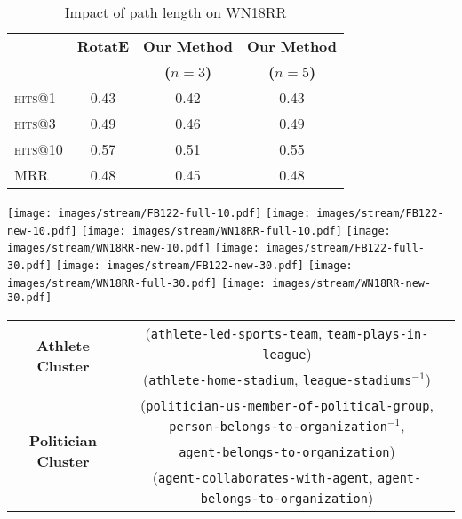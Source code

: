 \documentclass[11pt,a4paper]{article}
\newcommand{\nell}{NELL-995\xspace}
\begin{document}
\begin{table}
\centering
\small
\begin{tabular}{ l c c c}
\toprule
& \textbf{RotatE} & \textbf{Our Method} & \textbf{Our Method}   \\
& & \textbf{($n=3$)} & \textbf{($n=5$)}   \\
\midrule
  \textsc{hits}@1 & 0.43 & 0.42 & 0.43\\
  \textsc{hits}@3  & 0.49 & 0.46 & 0.49\\
  \textsc{hits}@10  & 0.57 & 0.51 & 0.55\\
  \textsc{MRR}   & 0.48 & 0.45 & 0.48\\
\bottomrule
\end{tabular}
\vspace{-2mm}
\caption{Impact of path length on WN18RR}
\label{tab:wn18rr_pathlen}
\vspace{-4mm}
\end{table}

\begin{figure*}
    \centering
    \texttt{[image: images/stream/FB122-full-10.pdf]}
    \texttt{[image: images/stream/FB122-new-10.pdf]}
    \texttt{[image: images/stream/WN18RR-full-10.pdf]}
    \texttt{[image: images/stream/WN18RR-new-10.pdf]}
    \texttt{[image: images/stream/FB122-full-30.pdf]}
    \texttt{[image: images/stream/FB122-new-30.pdf]}
    \texttt{[image: images/stream/WN18RR-full-30.pdf]}
    \texttt{[image: images/stream/WN18RR-new-30.pdf]}
    \caption{Results for open-world setting when trained with 10\% (top row) and 30\% (bottom row) of already seen edges. Our online method matches the offline version of our approach and outperforms the online variants of RotatE. After all data is observed our online method achieves results closest to the best offline method's results.}
    \label{fig:streaming}
\end{figure*}

\begin{table*}
    \centering
    \small
    \begin{tabular}{c c}
    \toprule
      \multirow{2}{*}{\bf Athlete Cluster}  & (\texttt{athlete-led-sports-team}, \texttt{team-plays-in-league})\\
         & (\texttt{athlete-home-stadium}, \texttt{league-stadiums}$^{-1}$)\\\midrule
        \multirow{3}{*}{\bf Politician Cluster}  & (\texttt{politician-us-member-of-political-group}, \texttt{person-belongs-to-organization}$^{-1}$, \\
        & \texttt{agent-belongs-to-organization}) \\
         & (\texttt{agent-collaborates-with-agent}, \texttt{agent-belongs-to-organization})\\\bottomrule
    \end{tabular}
    \caption{High scoring paths in different clusters for the query \texttt{agent-belongs-to-organization} in \nell}
    \label{tab:nell_eye_candy}
\end{table*}
\end{document}
